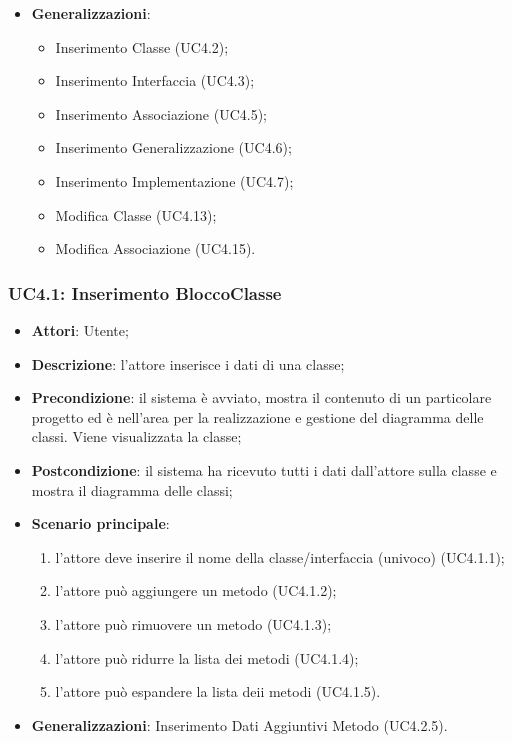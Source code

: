 \begin{itemize}
\begin{enumerate}
	\end{enumerate}
	\item \textbf{Generalizzazioni}:
	\begin{itemize}
		\item Inserimento Classe (UC4.2);
		\item Inserimento Interfaccia (UC4.3);
		\item Inserimento Associazione (UC4.5);
		\item Inserimento Generalizzazione (UC4.6);
		\item Inserimento Implementazione (UC4.7);
		\item Modifica Classe (UC4.13);
		\item Modifica Associazione (UC4.15).
	\end{itemize}
\end{itemize}

\subsubsection{UC4.1: Inserimento BloccoClasse}
\label{UC4.1}
\begin{itemize}
	\item \textbf{Attori}: Utente;
	\item \textbf{Descrizione}: l'attore inserisce i dati di una classe;
	\item \textbf{Precondizione}: il sistema è avviato, mostra il contenuto di un particolare progetto ed è nell'area per la realizzazione e gestione del diagramma delle classi. Viene visualizzata la classe;
	\item \textbf{Postcondizione}: il sistema ha ricevuto tutti i dati dall'attore sulla classe e mostra il diagramma delle classi;
	\item \textbf{Scenario principale}:
	\begin{enumerate}
		\item l'attore deve inserire il nome della classe/interfaccia (univoco) (UC4.1.1);
		\item l'attore può aggiungere un metodo (UC4.1.2);
		\item l'attore può rimuovere un metodo (UC4.1.3);
		\item l'attore può ridurre la lista dei metodi (UC4.1.4);
		\item l'attore può espandere la lista deii metodi (UC4.1.5).
	\end{enumerate}
	\item \textbf{Generalizzazioni}: Inserimento Dati Aggiuntivi Metodo (UC4.2.5).%
\end{itemize}

